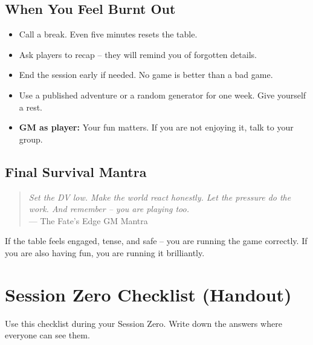 \subsection*{When You Feel Burnt Out}
\begin{itemize}
  \item Call a break. Even five minutes resets the table.
  \item Ask players to recap – they will remind you of forgotten details.
  \item End the session early if needed. No game is better than a bad game.
  \item Use a published adventure or a random generator for one week. Give yourself a rest.
  \item \textbf{GM as player:} Your fun matters. If you are not enjoying it, talk to your group.
\end{itemize}

\subsection*{Final Survival Mantra}
\begin{quote}
\emph{Set the DV low. Make the world react honestly. Let the pressure do the work. And remember – you are playing too.} \\
— The Fate’s Edge GM Mantra
\end{quote}

If the table feels engaged, tense, and safe – you are running the game correctly. If you are also having fun, you are running it brilliantly.

\section{Session Zero Checklist (Handout)}
\label{sec:session-zero-checklist}

Use this checklist during your Session Zero. Write down the answers where everyone can see them.

